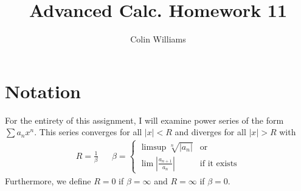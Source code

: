 \documentclass[10pt,a4paper]{article}
\title{Advanced Calc. Homework 11}
\author{Colin Williams}
\theoremstyle{definition}
\begin{document}
\maketitle
\section*{Notation}
For the entirety of this assignment, I will examine power series of the form $\displaystyle \sum a_nx^n$. This series converges for all $|x| < R$ and diverges for all $|x| > R$ with 
\begin{align*}
R = \frac{1}{\beta} && \beta = \begin{cases}
\limsup \sqrt[n]{|a_n|} &\text{or}\\
\lim \left|\frac{a_{n+1}}{a_n}\right| &\text{if it exists}
\end{cases}
\end{align*}
Furthermore, we define $R = 0$ if $\beta = \infty$ and $R = \infty$ if $\beta = 0$.
\end{document}
